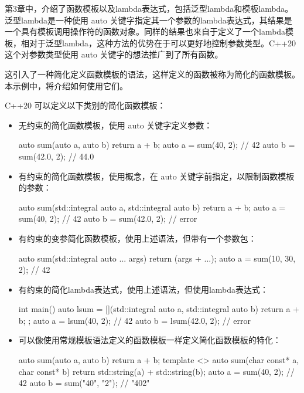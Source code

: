 

第3章中，介绍了函数模板以及lambda表达式，包括泛型lambda和模板lambda。泛型lambda是一种使用 auto 关键字指定其一个参数的lambda表达式，其结果是一个具有模板调用操作符的函数对象。同样的结果也来自于定义了一个lambda模板，相对于泛型lambda，这种方法的优势在于可以更好地控制参数类型。C++20这个对参数类型使用 auto 关键字的想法推广到了所有函数。

这引入了一种简化定义函数模板的语法，这样定义的函数被称为简化的函数模板。本示例中，将介绍如何使用它们。


C++20 可以定义以下类别的简化函数模板：

\begin{itemize}
\item
无约束的简化函数模板，使用 auto 关键字定义参数：

\begin{cpp}
auto sum(auto a, auto b)
{
    return a + b;
}
auto a = sum(40, 2);    // 42
auto b = sum(42.0, 2);  // 44.0
\end{cpp}

\item
有约束的简化函数模板，使用概念，在 auto 关键字前指定，以限制函数模板的参数：

\begin{cpp}
auto sum(std::integral auto a, std::integral auto b)
{
    return a + b;
}
auto a = sum(40, 2);    // 42
auto b = sum(42.0, 2);  // error
\end{cpp}

\item
有约束的变参简化函数模板，使用上述语法，但带有一个参数包：

\begin{cpp}
auto sum(std::integral auto ... args)
{
    return (args + ...);
}
auto a = sum(10, 30, 2);   // 42
\end{cpp}

\item
有约束的简化lambda表达式，使用上述语法，但使用lambda表达式：

\begin{cpp}
int main()
{
    auto lsum = [](std::integral auto a, std::integral auto b)
    {
        return a + b;
    };
    auto a = lsum(40, 2);    // 42
    auto b = lsum(42.0, 2);  // error
}
\end{cpp}

\item
可以像使用常规模板语法定义的函数模板一样定义简化函数模板的特化：

\begin{cpp}
auto sum(auto a, auto b)
{
    return a + b;
}
template <>
auto sum(char const* a, char const* b)
{
    return std::string(a) + std::string(b);
}
auto a = sum(40, 2);       // 42
auto b = sum("40", "2");   // "402"
\end{cpp}
\end{itemize}

